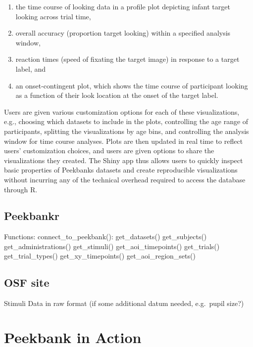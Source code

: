 \documentclass[
  english,
  man,floatsintext]{apa6}
\providecommand{\tightlist}{%
  \setlength{\itemsep}{0pt}\setlength{\parskip}{0pt}}
\begin{document}
\begin{enumerate}
\def\labelenumi{\arabic{enumi}.}
\tightlist
\item
  the time course of looking data in a profile plot depicting infant target looking across trial time,
\item
  overall accuracy (proportion target looking) within a specified analysis window,
\item
  reaction times (speed of fixating the target image) in response to a target label, and
\item
  an onset-contingent plot, which shows the time course of participant looking as a function of their look location at the onset of the target label.
\end{enumerate}

Users are given various customization options for each of these visualizations, e.g., choosing which datasets to include in the plots, controlling the age range of participants, splitting the visualizations by age bins, and controlling the analysis window for time course analyses.
Plots are then updated in real time to reflect users' customization choices, and users are given options to share the visualizations they created.
The Shiny app thus allows users to quickly inspect basic properties of Peekbanks datasets and create reproducible visualizations without incurring any of the technical overhead required to access the database through R.

\hypertarget{peekbankr}{%
\subsection{Peekbankr}\label{peekbankr}}

Functions:
connect\_to\_peekbank():
get\_datasets()
get\_subjects()
get\_administrations()
get\_stimuli()
get\_aoi\_timepoints()
get\_trials()
get\_trial\_types()
get\_xy\_timepoints()
get\_aoi\_region\_sets()

\hypertarget{osf-site}{%
\subsection{OSF site}\label{osf-site}}

Stimuli
Data in raw format (if some additional datum needed, e.g.~pupil size?)

\hypertarget{peekbank-in-action}{%
\section{Peekbank in Action}\label{peekbank-in-action}}
\end{document}
